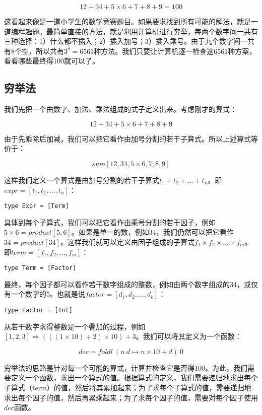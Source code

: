 \documentclass{article}
\begin{document}
\[
12 + 34 + 5 \times 6 + 7 + 8 + 9 = 100
\]

这看起来像是一道小学生的数学竞赛题目。如果要求找到所有可能的解法，就是一道编程趣题。最简单直接的方法，就是利用计算机进行穷举，每两个数字间一共有三种选择：1）什么都不插入；2）插入加号；3）插入乘号。由于九个数字间一共有8个空，所以共有$3^8 = 6561$种方法。我们只要让计算机逐一检查这6561种方案，看看哪些最终得100就可以了。

\subsection{穷举法}

我们先把一个由数字、加法、乘法组成的式子定义出来。考虑刚才的算式：

\[
12 + 34 + 5 \times 6 + 7 + 8 + 9
\]

由于先乘除后加减，我们可以把它看作由加号分割的若干子算式。所以上述算式等价于：

\[
sum [12, 34, 5 \times 6, 7, 8, 9]
\]

这样我们定义一个算式是由加号分割的若干子算式$t_1 + t_2 + ... + t_n$。即$expr = [t_1, t_2, ..., t_n]$：

\lstset{frame = none}
\begin{lstlisting}
type Expr = [Term]
\end{lstlisting}

具体到每个子算式，我们可以把它看作由乘号分割的若干因子，例如$5 \times 6 = product [5, 6]$。如果是单一的数，例如$34$，我们仍然可以把它看作$34 = product [34]$。这样我们就可以定义由因子组成的子算式$f_1 \times f_2 \times ... \times f_m$。即$term = [f_1, f_2, ..., f_m]$：

\begin{lstlisting}
type Term = [Factor]
\end{lstlisting}

最终，每个因子都可以看作若干数字组成的整数，例如由两个数字组成的34，或仅有一个数字的5。也就是说$factor = [d_1, d_2, ..., d_k]$：

\begin{lstlisting}
type Factor = [Int]
\end{lstlisting}

从若干数字求得整数是一个叠加的过程，例如$[1, 2, 3] \Rightarrow (((1 \times 10) + 2) \times 10) + 3$。我们可以将其定义为一个函数：

\[
dec = foldl\ (n\ d \mapsto n \times 10 + d)\ 0
\]

穷举法的思路是针对每一个可能的算式，计算并检查它是否得100。为此，我们需要定义一个函数，求出一个算式的值。根据算式的定义，我们需要递归地求出每个子算式（term）的值，然后将其累加起来；为了求每个子算式的值，需要递归地求出每个因子的值，然后再累乘起来；为了求每个因子的值，需要对每个因子使用$dec$函数。
\end{document}
